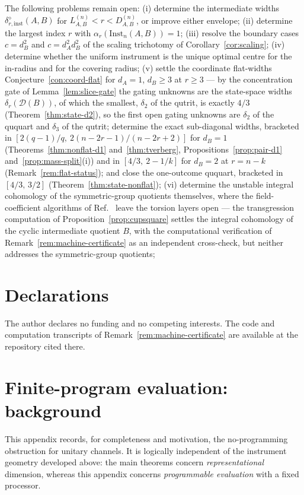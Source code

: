 \documentclass[11pt,a4paper]{article}
\newcommand{\Inst}{\mathrm{Inst}}
\begin{document}
The following problems remain open: (i) determine the intermediate widths $\delta_{r,\mathrm{inst}}^{\diamond}(A,B)$ for $L_{A,B}^{(n)}<r<D_{A,B}^{(n)}$, or improve either envelope; (ii) determine the largest index $r$ with $\alpha_r(\Inst_n(A,B))=1$; (iii) resolve the boundary cases $c=d_B^2$ and $c=d_A^2d_B^2$ of the scaling trichotomy of Corollary~\ref{cor:scaling}; (iv) determine whether the uniform instrument is the unique optimal centre for the in-radius and for the covering radius; (v) settle the coordinate flat-widths Conjecture~\ref{con:coord-flat} for $d_A=1$, $d_B\ge3$ at $r\ge3$ --- by the concentration gate of Lemma~\ref{lem:slice-gate} the gating unknowns are the state-space widths $\delta_r(\mathcal D(B))$, of which the smallest, $\delta_2$ of the qutrit, is exactly $4/3$ (Theorem~\ref{thm:state-d2}), so the first open gating unknowns are $\delta_2$ of the ququart and $\delta_3$ of the qutrit; determine the exact sub-diagonal widths, bracketed in $[2(q-1)/q,\ 2(n-2r-1)/(n-2r+2)]$ for $d_B=1$ (Theorems~\ref{thm:nonflat-d1} and~\ref{thm:tverberg}, Propositions~\ref{prop:pair-d1} and~\ref{prop:mass-split}(i)) and in $[4/3,\ 2-1/k]$ for $d_B=2$ at $r=n-k$ (Remark~\ref{rem:flat-status}); and close the one-outcome ququart, bracketed in $[4/3,\,3/2]$ (Theorem~\ref{thm:state-nonflat}); (vi) determine the unstable integral cohomology of the symmetric-group quotients themselves, where the field-coefficient algorithms of Ref.~\cite{GuerraJana2025} leave the torsion layers open --- the transgression computation of Proposition~\ref{prop:cupsquare} settles the integral cohomology of the cyclic intermediate quotient $B$, with the computational verification of Remark~\ref{rem:machine-certificate} as an independent cross-check, but neither addresses the symmetric-group quotients;

\section*{Declarations}
The author declares no funding and no competing interests. The code and computation transcripts of Remark~\ref{rem:machine-certificate} are available at the repository cited there.

\appendix

\section{Finite-program evaluation: background}
\label{app:no-programming}

This appendix records, for completeness and motivation, the no-programming obstruction for unitary channels. It is logically independent of the instrument geometry developed above: the main theorems concern \emph{representational} dimension, whereas this appendix concerns \emph{programmable evaluation} with a fixed processor.
\end{document}
